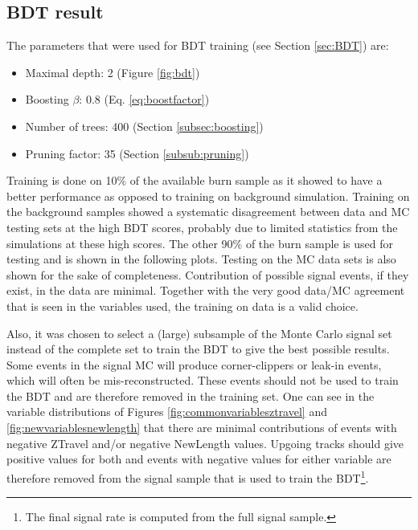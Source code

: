 \subsection{BDT result}
The parameters that were used for BDT training (see Section \ref{sec:BDT}) are:
\vspace{2mm}
\begin{itemize}
\item Maximal depth: 2 (Figure \ref{fig:bdt})
\item Boosting $\beta$: 0.8 (Eq. \ref{eq:boostfactor})
\item Number of trees: 400 (Section \ref{subsec:boosting})
\item Pruning factor: 35 (Section \ref{subsub:pruning})
\end{itemize}
\vspace{2mm}
\noindent Training is done on 10\% of the available burn sample as it showed to have a better performance as opposed to training on background simulation. Training on the background samples showed a systematic disagreement between data and MC testing sets at the high BDT scores, probably due to limited statistics from the simulations at these high scores. The other 90\% of the burn sample is used for testing and is shown in the following plots. Testing on the MC data sets is also shown for the sake of completeness. Contribution of possible signal events, if they exist, in the data are minimal. Together with the very good data/MC agreement that is seen in the variables used, the training on data is a valid choice.

Also, it was chosen to select a (large) subsample of the Monte Carlo signal set instead of the complete set to train the BDT to give the best possible results. Some events in the signal MC will produce corner-clippers or leak-in events, which will often be mis-reconstructed. These events should not be used to train the BDT and are therefore removed in the training set. One can see in the variable distributions of Figures \ref{fig:commonvariablesztravel} and \ref{fig:newvariablesnewlength} that there are minimal contributions of events with negative ZTravel and/or negative NewLength values. Upgoing tracks should give positive values for both and events with negative values for either variable are therefore removed from the signal sample that is used to train the BDT\footnote{The final signal rate is computed from the full signal sample.}.\\

